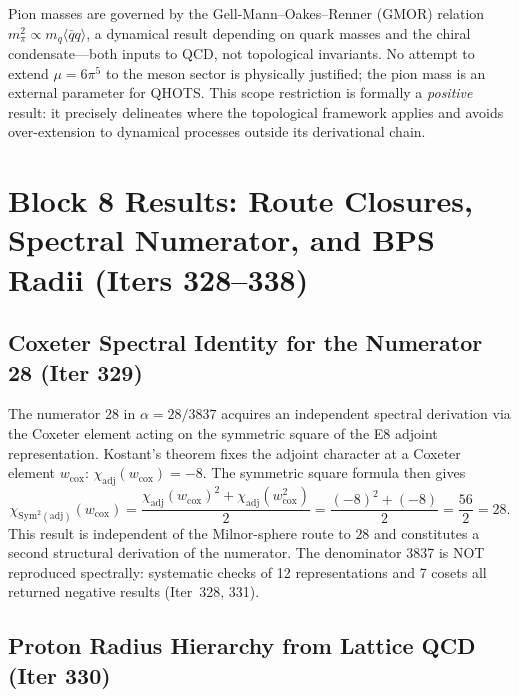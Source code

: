 \documentclass[aps,prd,twocolumn,superscriptaddress,floatfix,nofootinbib]{revtex4-2}
\theoremstyle{definition}
\theoremstyle{remark}
\begin{document}
Pion masses are governed by the Gell-Mann--Oakes--Renner (GMOR) relation
$m_\pi^2 \propto m_q\langle\bar{q}q\rangle$, a dynamical result depending on
quark masses and the chiral condensate---both inputs to QCD, not topological
invariants.  No attempt to extend $\mu = 6\pi^5$ to the meson sector is
physically justified; the pion mass is an external parameter for QHOTS.
This scope restriction is formally a \emph{positive} result: it precisely
delineates where the topological framework applies and avoids over-extension
to dynamical processes outside its derivational chain.

\section{Block 8 Results: Route Closures, Spectral Numerator, and BPS Radii (Iters 328--338)}
\label{sec:block8}

\subsection{Coxeter Spectral Identity for the Numerator 28 (Iter 329)}
\label{sec:spectral-28}

The numerator $28$ in $\alpha = 28/3837$ acquires an independent spectral derivation
via the Coxeter element acting on the symmetric square of the E8 adjoint representation.
Kostant's theorem fixes the adjoint character at a Coxeter element $w_{\mathrm{cox}}$:
$\chi_{\mathrm{adj}}(w_{\mathrm{cox}}) = -8$.
The symmetric square formula then gives
\begin{equation}
  \chi_{\mathrm{Sym}^2(\mathrm{adj})}(w_{\mathrm{cox}})
  = \frac{\chi_{\mathrm{adj}}(w_{\mathrm{cox}})^2 + \chi_{\mathrm{adj}}(w_{\mathrm{cox}}^2)}{2}
  = \frac{(-8)^2 + (-8)}{2} = \frac{56}{2} = 28.
\end{equation}
This result is independent of the Milnor-sphere route to $28$ and constitutes a
second structural derivation of the numerator.  The denominator 3837 is NOT
reproduced spectrally: systematic checks of 12 representations and 7 cosets all
returned negative results (Iter~328, 331).

\subsection{Proton Radius Hierarchy from Lattice QCD (Iter 330)}
\label{sec:radius-hierarchy}
\end{document}
